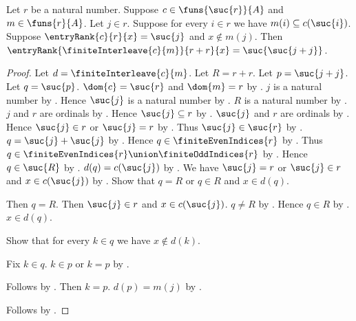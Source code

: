 \begin{proposition}\label{entry_rank_interleave_after_inserted}
    Let $r$ be a natural number.
    Suppose $c\in\funs{\suc{r}}{A}$ and $m\in\funs{r}{A}$.
    Let $j\in r$.
    Suppose for every $i\in r$ we have
        $m(i)\subseteq c(\suc{i})$.
    Suppose $\entryRank{c}{r}{x}=\suc{j}$ and $x\notin m(j)$.
    Then
        $\entryRank{\finiteInterleave{c}{m}}{r+r}{x}
            =\suc{\suc{j+j}}$.
\end{proposition}
\begin{proof}
    Let $d=\finiteInterleave{c}{m}$.
    Let $R=r+r$.
    Let $p=\suc{j+j}$.
    Let $q=\suc{p}$.
    $\dom{c}=\suc{r}$ and $\dom{m}=r$ by .
    $j$ is a natural number
        by .
    Hence $\suc{j}$ is a natural number by .
    $R$ is a natural number by .
    $j$ and $r$ are ordinals by .
    Hence $\suc{j}\subseteq r$ by .
    $\suc{j}$ and $r$ are ordinals
        by .
    Hence $\suc{j}\in r$ or $\suc{j}=r$
        by .
    Thus $\suc{j}\in\suc{r}$ by .
    $q=\suc{j}+\suc{j}$
        by .
    Hence $q\in\finiteEvenIndices{r}$
        by .
    Thus $q\in\finiteEvenIndices{r}\union\finiteOddIndices{r}$
        by .
    Hence $q\in\suc{R}$
        by .
    $d(q)=c(\suc{j})$ by .
    We have $\suc{j}=r$ or
        $\suc{j}\in r$ and $x\in c(\suc{j})$
        by .
    Show that $q=R$ or $q\in R$ and $x\in d(q)$.
    \begin{subproof}
        \begin{byCase}
            Then $q=R$.
            Then $\suc{j}\in r$ and $x\in c(\suc{j})$.
            $q\neq R$ by .
            Hence $q\in R$ by .
            $x\in d(q)$.
        \end{byCase}
    \end{subproof}
    Show that for every $k\in q$ we have $x\notin d(k)$.
    \begin{subproof}
        Fix $k\in q$.
        $k\in p$ or $k=p$ by .
        \begin{byCase}
            Follows by
                .
            Then $k=p$.
            $d(p)=m(j)$ by .
        \end{byCase}
    \end{subproof}
    Follows by .
\end{proof}


